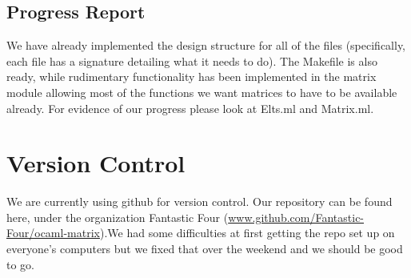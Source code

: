 \documentclass[letterpaper,11pt]{article}
\begin{document}
\subsection{Progress Report}
We have already implemented the design structure for all of the files
(specifically, each file has a signature detailing what it needs to do). The
Makefile is also ready, while rudimentary functionality has been implemented in
the matrix module allowing most of the functions we want matrices to have to be
available already. For evidence of our progress please look at Elts.ml and
Matrix.ml.

\section{Version Control}
We are currently using github for version control. Our repository can be found
here, under the organization Fantastic Four
(\url{www.github.com/Fantastic-Four/ocaml-matrix}).We had some difficulties at
first getting the repo set up on everyone’s computers but we fixed that over the
weekend and we should be good to go.
\end{document}
